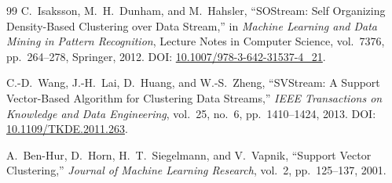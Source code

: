 \begin{thebibliography}{99}
C.~Isaksson, M.~H.~Dunham, and M.~Hahsler,
\newblock ``SOStream: Self Organizing Density-Based Clustering over Data Stream,''
\newblock in \emph{Machine Learning and Data Mining in Pattern Recognition}, Lecture Notes in Computer Science, vol.~7376, pp.~264--278, Springer, 2012.
\newblock DOI: \href{https://doi.org/10.1007/978-3-642-31537-4_21}{10.1007/978-3-642-31537-4\_21}.

C.-D.~Wang, J.-H.~Lai, D.~Huang, and W.-S.~Zheng,
\newblock ``SVStream: A Support Vector-Based Algorithm for Clustering Data Streams,''
\newblock \emph{IEEE Transactions on Knowledge and Data Engineering}, vol.~25, no.~6, pp.~1410--1424, 2013.
\newblock DOI: \href{https://doi.org/10.1109/TKDE.2011.263}{10.1109/TKDE.2011.263}.

A.~Ben-Hur, D.~Horn, H.~T.~Siegelmann, and V.~Vapnik,
\newblock ``Support Vector Clustering,''
\newblock \emph{Journal of Machine Learning Research}, vol.~2, pp.~125--137, 2001.
\end{thebibliography}
